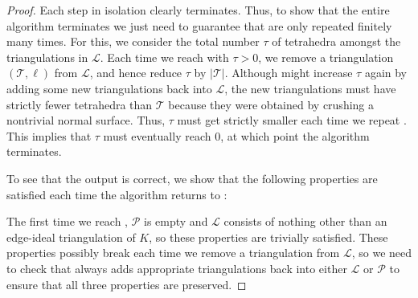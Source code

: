 \documentclass[a4paper,UKenglish,cleveref, autoref, thm-restate]{lipics-v2021}
\newcommand{\tri}{\mathcal{T}}
\begin{document}
\begin{proof}
Each step in isolation clearly terminates. Thus, to show that the entire algorithm terminates we just need to
guarantee that  are only repeated finitely many times.
For this, we consider the total number $\tau$ of tetrahedra amongst the triangulations in $\mathcal{L}$.
Each time we reach  with $\tau > 0$, we remove a triangulation $(\tri,\ell)$ from $\mathcal{L}$, and hence reduce $\tau$ by $|\tri|$.
Although  might increase $\tau$ again by adding some new triangulations back into $\mathcal{L}$,
the new triangulations must have strictly fewer tetrahedra than $\tri$ because they were obtained by crushing a nontrivial normal surface.
Thus, $\tau$ must get strictly smaller each time we repeat .
This implies that $\tau$ must eventually reach $0$, at which point the algorithm terminates.

To see that the output is correct, we show that the following properties are satisfied each time the algorithm returns to :
The first time we reach , $\mathcal{P}$ is empty and $\mathcal{L}$ consists of
nothing other than an edge-ideal triangulation of $K$, so these properties are trivially satisfied.
These properties possibly break each time we remove a triangulation from $\mathcal{L}$, so we need to check that  always
adds appropriate triangulations back into either $\mathcal{L}$ or $\mathcal{P}$ to ensure that all three properties are preserved.


\end{proof}
\end{document}

